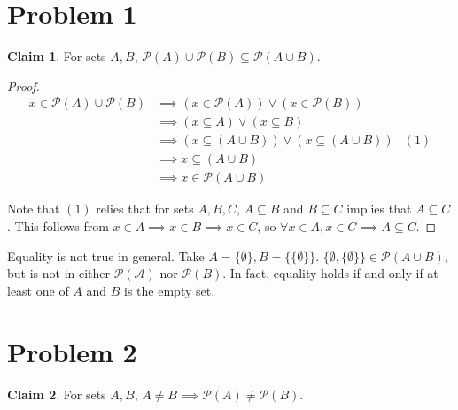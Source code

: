 \documentclass[12pt,letterpaper]{article}
\theoremstyle{definition}
\newtheorem*{claim}{Claim}
\begin{document}
\section*{Problem 1}

\begin{claim} 
    For sets $A, B$, $\mathcal{P}(A) \cup \mathcal{P}(B) \subseteq  \mathcal{P}(A \cup B)$.
\end{claim}

\begin{proof}
    \begin{align*}
        x \in \mathcal{P}(A) \cup \mathcal{P}(B) &\implies (x \in \mathcal{P}(A)) \lor (x \in \mathcal{P}(B)) \\
        &\implies (x \subseteq A) \lor (x \subseteq B) \\
        &\implies (x \subseteq (A \cup B)) \lor (x \subseteq (A \cup B)) & (1)\\
        &\implies x \subseteq (A \cup B) \\
        &\implies x \in \mathcal{P}(A \cup B)
    \end{align*}
    
    Note that $(1)$ relies that for sets $A,B,C$, $A \subseteq B$ and $B \subseteq C$ implies that $A \subseteq C$. 
    This follows from $x \in A \implies x \in B \implies x \in C$, so $\forall x \in A, x \in C \implies A \subseteq C$.
\end{proof}
    
Equality is not true in general. Take $A = \{\emptyset\}, B = \{\{\emptyset\}\}$. $\{\emptyset, \{\emptyset\}\} \in \mathcal{P}(A \cup B)$, but is not in either $\mathcal{P(A)}$ nor $\mathcal{P}(B)$. In fact, equality holds if and only if at least one of $A$ and $B$ is the empty set.

\section*{Problem 2}

\begin{claim} 
    For sets $A, B$, $A \neq B \implies \mathcal{P}(A) \neq \mathcal{P}(B)$.
\end{claim}
\end{document}
